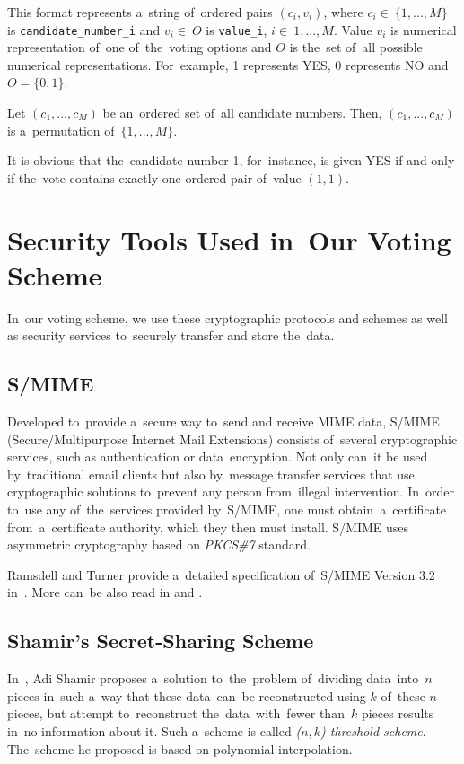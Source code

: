This format represents a~string of~ordered pairs $(c_i, v_i)$, where $c_i \in~\{1,...,M\}$ is \newline \texttt{candidate\_number\_i} and $v_i \in~O$ is \texttt{value\_i}, $i\in~1,...,M$. Value $v_i$ is numerical representation of~one of~the~voting options and $O$ is the~set of~all possible numerical representations. For~example, 1 represents YES, 0 represents NO and $O = \{0, 1\}$. 

Let $(c_1, ..., c_M)$ be an~ordered set of~all candidate numbers. Then, $(c_1, ..., c_M)$ is a~permutation of~$\{1,...,M\}$.

It is obvious that the~candidate number 1, for~instance, is given YES if and only if the~vote contains exactly one ordered pair of~value $(1, 1)$.

\section{Security Tools Used in~Our Voting Scheme}
\label{sek:cryptography}
In~our voting scheme, we use these cryptographic protocols and schemes as well as security services to~securely transfer and store the~data.
\subsection{S/MIME}
Developed to~provide a~secure way to~send and receive MIME data, S/MIME (Secure/Multipurpose Internet Mail Extensions) consists of~several cryptographic services, such as authentication or data~encryption. Not only can~it be used by~traditional email clients but also by~message transfer services that use cryptographic solutions to~prevent any person from~illegal intervention. In~order to~use any of~the~services provided by~S/MIME, one must obtain~a~certificate from~a~certificate authority, which they then must install. S/MIME uses asymmetric cryptography based on \emph{PKCS\#7} standard.


Ramsdell and Turner provide a~detailed specification of~S/MIME Version 3.2 in~\cite{Ramsdell}. More can~be also read in \cite{Turner} and \cite{SMIME}.
\subsection{Shamir's Secret-Sharing Scheme}
In~\cite{Shamir}, Adi Shamir proposes a~solution to~the~problem of~dividing data~into~$n$ pieces in~such a~way that these data~can~be reconstructed using $k$ of~these $n$ pieces, but attempt to~reconstruct the~data~with~fewer than~$k$ pieces results in~no information about it. Such a~scheme is called \emph{($n,k$)-threshold scheme}. The~scheme he proposed is based on polynomial interpolation. 

